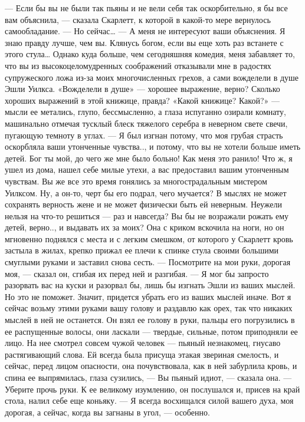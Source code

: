 — Если бы вы не были так пьяны и не вели себя так оскорбительно, я бы все вам объяснила, — сказала Скарлетт, к которой в какой-то мере вернулось самообладание. — Но сейчас…
— А меня не интересуют ваши объяснения. Я знаю правду лучше, чем вы. Клянусь богом, если вы еще хоть раз встанете с этого стула… Однако куда больше, чем сегодняшняя комедия, меня забавляет то, что вы из высокоцеломудренных соображений отказывали мне в радостях супружеского ложа из-за моих многочисленных грехов, а сами вожделели в душе Эшли Уилкса. «Вожделели в душе» — хорошее выражение, верно? Сколько хороших выражений в этой книжице, правда?
«Какой книжице? Какой?» — мысли ее метались, глупо, бессмысленно, а глаза испуганно озирали комнату, машинально отмечая тусклый блеск тяжелого серебра в неверном свете свечи, пугающую темноту в углах.
— Я был изгнан потому, что моя грубая страсть оскорбляла ваши утонченные чувства.., и потому, что вы не хотели больше иметь детей. Бог ты мой, до чего же мне было больно! Как меня это ранило! Что ж, я ушел из дома, нашел себе милые утехи, а вас предоставил вашим утонченным чувствам. Вы же все это время гонялись за многострадальным мистером Уилксом. Ну, а он-то, черт бы его подрал, чего мучается? В мыслях не может сохранять верность жене и не может физически быть ей неверным. Неужели нельзя на что-то решиться — раз и навсегда? Вы бы не возражали рожать ему детей, верно.., и выдавать их за моих?
Она с криком вскочила на ноги, но он мгновенно поднялся с места и с легким смешком, от которого у Скарлетт кровь застыла в жилах, крепко прижал ее плечи к спинке стула своими большими смуглыми руками и заставил снова сесть.
— Посмотрите на мои руки, дорогая моя, — сказал он, сгибая их перед ней и разгибая. — Я мог бы запросто разорвать вас на куски и разорвал бы, лишь бы изгнать Эшли из ваших мыслей. Но это не поможет. Значит, придется убрать его из ваших мыслей иначе. Вот я сейчас возьму этими руками вашу голову и раздавлю как орех, так что никаких мыслей в ней не останется.
Он взял ее голову в руки, пальцы его погрузились в ее распущенные волосы, они ласкали — твердые, сильные, потом приподняли ее лицо. На нее смотрел совсем чужой человек — пьяный незнакомец, гнусаво растягивающий слова. Ей всегда была присуща этакая звериная смелость, и сейчас, перед лицом опасности, она почувствовала, как в ней забурлила кровь, и спина ее выпрямилась, глаза сузились, — Вы пьяный идиот, — сказала она. — Уберите прочь руки. К ее великому изумлению, он послушался и, присев на край стола, налил себе еще коньяку.
— Я всегда восхищался силой вашего духа, моя дорогая, а сейчас, когда вы загнаны в угол, — особенно.
